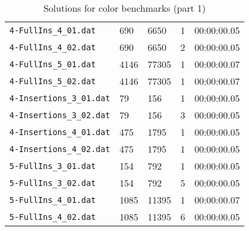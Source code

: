 \documentclass{article}
\begin{document}
\begin{table}
\begin{tabular}{y{3.6cm}x{1cm}x{1.5cm}x{1.5cm}y{1.5cm}}
    \verb|4-FullIns_4_01.dat| & 690 & 6650 & 1 & 00:00:00.05 \\
    \verb|4-FullIns_4_02.dat| & 690 & 6650 & 2 & 00:00:00.05 \\
    \verb|4-FullIns_5_01.dat| & 4146 & 77305 & 1 & 00:00:00.07 \\
    \verb|4-FullIns_5_02.dat| & 4146 & 77305 & 1 & 00:00:00.07 \\
    \verb|4-Insertions_3_01.dat| & 79 & 156 & 1 & 00:00:00.05 \\
    \verb|4-Insertions_3_02.dat| & 79 & 156 & 3 & 00:00:00.05 \\
    \verb|4-Insertions_4_01.dat| & 475 & 1795 & 1 & 00:00:00.05 \\
    \verb|4-Insertions_4_02.dat| & 475 & 1795 & 1 & 00:00:00.05 \\
    \verb|5-FullIns_3_01.dat| & 154 & 792 & 1 & 00:00:00.05 \\
    \verb|5-FullIns_3_02.dat| & 154 & 792 & 5 & 00:00:00.05 \\
    \verb|5-FullIns_4_01.dat| & 1085 & 11395 & 1 & 00:00:00.07 \\
    \verb|5-FullIns_4_02.dat| & 1085 & 11395 & 6 & 00:00:00.05 \\
  \end{tabular}
  \caption{Solutions for color benchmarks (part 1)}
\end{table}
\end{document}
